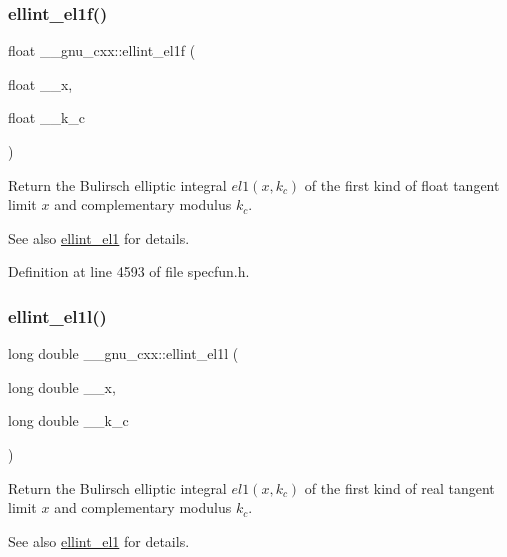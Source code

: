 \subsubsection{\texorpdfstring{ellint\+\_\+el1f()}{ellint\_el1f()}}
{\footnotesize\ttfamily float \+\_\+\+\_\+gnu\+\_\+cxx\+::ellint\+\_\+el1f (\begin{DoxyParamCaption}\item[{float}]{\+\_\+\+\_\+x,  }\item[{float}]{\+\_\+\+\_\+k\+\_\+c }\end{DoxyParamCaption})\hspace{0.3cm}{\ttfamily [inline]}}

Return the Bulirsch elliptic integral $ el1(x,k_c) $ of the first kind of {\ttfamily float} tangent limit $ x $ and complementary modulus $ k_c $.

\begin{DoxySeeAlso}{See also}
\hyperlink{group__gnu__math__spec__func_ga510b1e51e7d3bc937ed1b4c2f57492e4}{ellint\+\_\+el1} for details. 
\end{DoxySeeAlso}


Definition at line 4593 of file specfun.\+h.

\mbox{\label{group__gnu__math__spec__func_gaeed1201e421be410460739048cba5cd8}} 
\subsubsection{\texorpdfstring{ellint\+\_\+el1l()}{ellint\_el1l()}}
{\footnotesize\ttfamily long double \+\_\+\+\_\+gnu\+\_\+cxx\+::ellint\+\_\+el1l (\begin{DoxyParamCaption}\item[{long double}]{\+\_\+\+\_\+x,  }\item[{long double}]{\+\_\+\+\_\+k\+\_\+c }\end{DoxyParamCaption})\hspace{0.3cm}{\ttfamily [inline]}}

Return the Bulirsch elliptic integral $ el1(x,k_c) $ of the first kind of real tangent limit $ x $ and complementary modulus $ k_c $.

\begin{DoxySeeAlso}{See also}
\hyperlink{group__gnu__math__spec__func_ga510b1e51e7d3bc937ed1b4c2f57492e4}{ellint\+\_\+el1} for details. 
\end{DoxySeeAlso}


